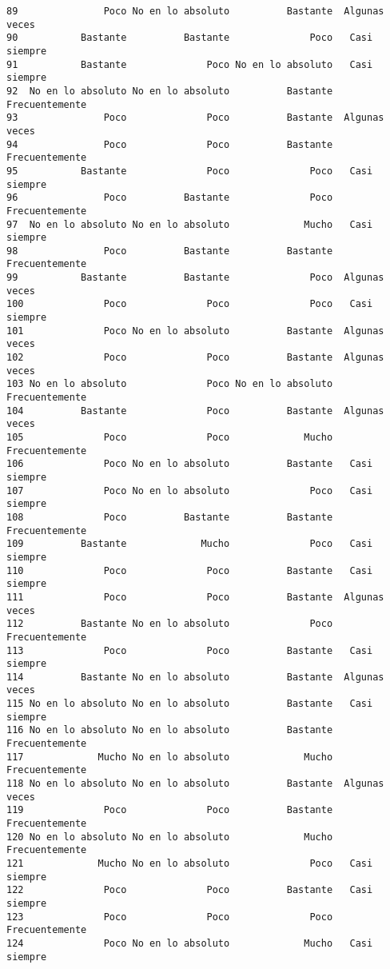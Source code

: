 \documentclass[
  letterpaper,
  DIV=11,
  numbers=noendperiod]{scrartcl}
\begin{document}
\begin{verbatim}
89               Poco No en lo absoluto          Bastante  Algunas veces
90           Bastante          Bastante              Poco   Casi siempre
91           Bastante              Poco No en lo absoluto   Casi siempre
92  No en lo absoluto No en lo absoluto          Bastante Frecuentemente
93               Poco              Poco          Bastante  Algunas veces
94               Poco              Poco          Bastante Frecuentemente
95           Bastante              Poco              Poco   Casi siempre
96               Poco          Bastante              Poco Frecuentemente
97  No en lo absoluto No en lo absoluto             Mucho   Casi siempre
98               Poco          Bastante          Bastante Frecuentemente
99           Bastante          Bastante              Poco  Algunas veces
100              Poco              Poco              Poco   Casi siempre
101              Poco No en lo absoluto          Bastante  Algunas veces
102              Poco              Poco          Bastante  Algunas veces
103 No en lo absoluto              Poco No en lo absoluto Frecuentemente
104          Bastante              Poco          Bastante  Algunas veces
105              Poco              Poco             Mucho Frecuentemente
106              Poco No en lo absoluto          Bastante   Casi siempre
107              Poco No en lo absoluto              Poco   Casi siempre
108              Poco          Bastante          Bastante Frecuentemente
109          Bastante             Mucho              Poco   Casi siempre
110              Poco              Poco          Bastante   Casi siempre
111              Poco              Poco          Bastante  Algunas veces
112          Bastante No en lo absoluto              Poco Frecuentemente
113              Poco              Poco          Bastante   Casi siempre
114          Bastante No en lo absoluto          Bastante  Algunas veces
115 No en lo absoluto No en lo absoluto          Bastante   Casi siempre
116 No en lo absoluto No en lo absoluto          Bastante Frecuentemente
117             Mucho No en lo absoluto             Mucho Frecuentemente
118 No en lo absoluto No en lo absoluto          Bastante  Algunas veces
119              Poco              Poco          Bastante Frecuentemente
120 No en lo absoluto No en lo absoluto             Mucho Frecuentemente
121             Mucho No en lo absoluto              Poco   Casi siempre
122              Poco              Poco          Bastante   Casi siempre
123              Poco              Poco              Poco Frecuentemente
124              Poco No en lo absoluto             Mucho   Casi siempre

\end{verbatim}
\end{document}
